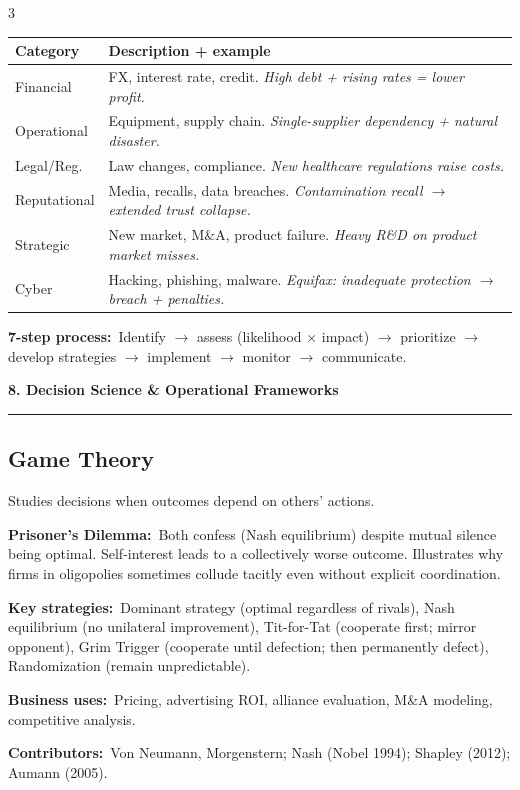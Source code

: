 \documentclass[7.6pt,letterpaper]{article}
\newcommand{\secbar}[1]{%
    \vspace{2pt}\noindent\textbf{#1}\par\vspace{1pt}\hrule\vspace{2pt}%
  }
\newcommand{\secbar}[1]{%
    \vspace{3pt}%
    \noindent\colorbox{navy}{\parbox{\dimexpr\linewidth-2\fboxsep}{%
      \fontsize{6.8pt}{8pt}\sffamily\bfseries\color{white}\strut\ #1\strut}}%
    \vspace{1pt}\par%
  }
\newcommand{\T}[1]{\textbf{\color{navy}#1}}
\newcommand{\kk}[2]{\noindent\T{#1}\ #2\par}
\newcommand{\eg}[1]{\textit{\color{mid}#1}}
\newcommand{\sh}{\rowcolor{strip}}
\newcommand{\ctab}[1]{{\fontsize{6.2pt}{7pt}\selectfont\setlength{\tabcolsep}{2.5pt}#1}}
\begin{document}
\begin{multicols}{3}
\ctab{\begin{tabular}{@{}p{1.4cm}p{4.2cm}@{}}
\toprule
\sh \T{Category} & \T{Description + example} \\
\midrule
Financial & FX, interest rate, credit. \eg{High debt + rising rates = lower profit.} \\
Operational & Equipment, supply chain. \eg{Single-supplier dependency + natural disaster.} \\
Legal/Reg. & Law changes, compliance. \eg{New healthcare regulations raise costs.} \\
Reputational & Media, recalls, data breaches. \eg{Contamination recall $\to$ extended trust collapse.} \\
Strategic & New market, M\&A, product failure. \eg{Heavy R\&D on product market misses.} \\
Cyber & Hacking, phishing, malware. \eg{Equifax: inadequate protection $\to$ breach + penalties.} \\
\bottomrule
\end{tabular}}

\kk{7-step process:}{Identify $\to$ assess (likelihood $\times$ impact) $\to$ prioritize $\to$ develop strategies $\to$ implement $\to$ monitor $\to$ communicate.}

\secbar{8. Decision Science \& Operational Frameworks}

\subsection{Game Theory}

Studies decisions when outcomes depend on others' actions.

\kk{Prisoner's Dilemma:}{Both confess (Nash equilibrium) despite mutual silence being optimal. Self-interest leads to a collectively worse outcome. Illustrates why firms in oligopolies sometimes collude tacitly even without explicit coordination.}
\kk{Key strategies:}{Dominant strategy (optimal regardless of rivals), Nash equilibrium (no unilateral improvement), Tit-for-Tat (cooperate first; mirror opponent), Grim Trigger (cooperate until defection; then permanently defect), Randomization (remain unpredictable).}
\kk{Business uses:}{Pricing, advertising ROI, alliance evaluation, M\&A modeling, competitive analysis.}
\kk{Contributors:}{Von Neumann, Morgenstern; Nash (Nobel 1994); Shapley (2012); Aumann (2005).}


\end{multicols}
\end{document}
